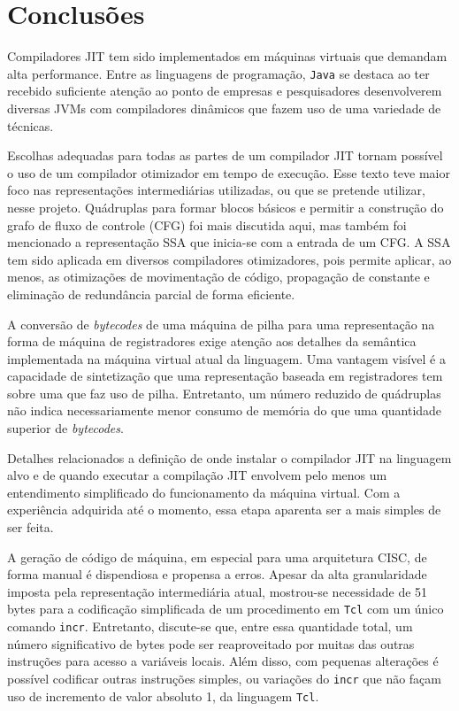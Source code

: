 \section{Conclusões}

Compiladores JIT tem sido implementados em máquinas virtuais que demandam
alta performance. Entre as linguagens de programação, \texttt{Java} se
destaca ao ter recebido suficiente atenção ao ponto de empresas e
pesquisadores desenvolverem diversas JVMs com compiladores
dinâmicos que fazem uso de uma variedade de técnicas.

Escolhas adequadas para todas as partes de um compilador JIT tornam
possível o uso de um compilador otimizador em tempo de execução. Esse
texto teve maior foco nas representações intermediárias utilizadas, ou
que se pretende utilizar, nesse projeto. Quádruplas para formar blocos
básicos e permitir a construção do grafo de fluxo de controle (CFG)
foi mais discutida aqui, mas também foi mencionado a representação SSA
que inicia-se com a entrada de um CFG. A SSA tem sido aplicada em
diversos compiladores otimizadores, pois permite aplicar, ao menos,
as otimizações de movimentação de código, propagação de constante e
eliminação de redundância parcial de forma eficiente.

A conversão de \textit{bytecodes} de uma máquina de pilha para uma
representação na forma de máquina de registradores exige atenção aos
detalhes da semântica implementada na máquina virtual atual da
linguagem. Uma vantagem visível é a capacidade de sintetização que
uma representação baseada em registradores tem sobre uma que faz uso
de pilha. Entretanto, um número reduzido de quádruplas não indica
necessariamente menor consumo de memória do que uma quantidade
superior de \textit{bytecodes}.

Detalhes relacionados a definição de onde instalar o compilador JIT na
linguagem alvo e de quando executar a compilação JIT envolvem pelo
menos um entendimento simplificado do funcionamento da máquina
virtual. Com a experiência adquirida até o momento, essa etapa aparenta
ser a mais simples de ser feita.

A geração de código de máquina, em especial para uma arquitetura CISC,
de forma manual é dispendiosa e propensa a erros. Apesar da alta
granularidade imposta pela representação intermediária atual,
mostrou-se necessidade de 51 bytes para a codificação simplificada de um
procedimento em \texttt{Tcl} com um único comando
\verb!incr!. Entretanto, discute-se que, entre essa quantidade total,
um número significativo de bytes pode ser reaproveitado por muitas das
outras instruções para acesso a variáveis locais. Além disso, com
pequenas alterações é possível codificar outras instruções simples, ou
variações do \verb!incr! que não façam uso de incremento de valor
absoluto 1, da linguagem \texttt{Tcl}.

